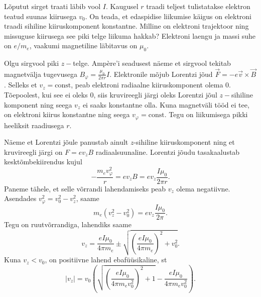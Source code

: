 
Lõputut sirget traati läbib vool $I$. Kaugusel $r$ traadi teljest tulistatakse elektron teatud suunas kiirusega $v_0$. On teada, et edaspidise liikumise käigus on elektroni traadi sihiline kiiruskomponent konstantne. Milline on elektroni trajektoor ning missuguse kiirusega see piki telge liikuma hakkab? Elektroni laengu ja massi suhe on $e/m_e$, vaakumi magnetiline läbitavus on $\mu_0$.


\hint

\solu
Olgu sirgvool piki $z-$telge. Ampère'i seadusest näeme et sirgvool tekitab magnetvälja tugevusega $B_\varphi = \frac{\mu_0}{2\pi r}I$. Elektronile mõjub Lorentzi jõud $\vec F = -e\vec v \times \vec B$. Selleks et $v_z = \mathrm{const}$, peab elektroni radiaalne kiiruskomponent olema $0$. Tõepoolest, kui see ei oleks 0, siis kruvireegli järgi oleks Lorentzi jõul $z-$sihiline komponent ning seega $v_z$ ei saaks konstantne olla. Kuna magnetväli tööd ei tee, on elektroni kiirus konstantne ning seega $v_\varphi = \mathrm{const}$. Tegu on liikumisega pikki heeliksit raadiusega $r$.

Näeme et Lorentzi jõule panustab ainult $z$-sihiline kiiruskomponent ning et kruvireegli järgi on $F = ev_z B$ radiaalsuunaline. Lorentzi jõudu tasakaalustab kesktõmbekiirendus kujul
\[
-\frac{m_ev_\varphi^2}{r} = ev_z B = ev_z \frac{I \mu_0}{2\pi r}.
\]
Paneme tähele, et selle võrrandi lahendamiseks peab $v_z$ olema negatiivne. Asendades $v_\varphi^2 = v_0^2 - v_z^2$, saame
\[
m_e(v_z^2 - v_0^2) = ev_z \frac{I\mu_0}{2\pi}.
\]
Tegu on ruutvõrrandiga, lahendiks saame
\[
v_z = \frac{e I\mu_0}{4\pi m_e} \pm \sqrt{\left(\frac{e I\mu_0}{4\pi m_e}\right)^2+v_0^2}.
\]
Kuna $v_z < v_0$, on positiivne lahend ebafüüsikaline, st
\[
|v_z| = v_0 \left(\sqrt{\left(\frac{e I\mu_0}{4\pi m_e v_0^2}\right)^2 + 1} - \frac{e I\mu_0}{4\pi m_e v_0^2}\right).
\]
\probend